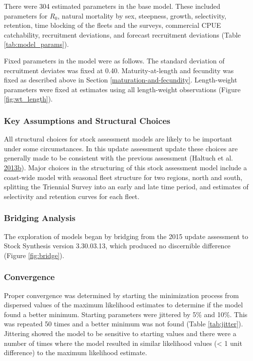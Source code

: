 \documentclass[12pt,]{article}
\begin{document}
There were 304 estimated parameters in the base model. These included
parameters for \(R_0\), natural mortality by sex, steepness, growth,
selectivity, retention, time blocking of the fleets and the surveys,
commercial CPUE catchability, recruitment deviations, and forecast
recruitment deviations (Table \ref{tab:model_params}).

Fixed parameters in the model were as follows. The standard deviation of
recruitment deviates was fixed at 0.40. Maturity-at-length and fecundity
was fixed as described above in Section \ref{maturation-and-fecundity}.
Length-weight parameters were fixed at estimates using all length-weight
observations (Figure \ref{fig:wt_length}).

\subsubsection{Key Assumptions and Structural
Choices}\label{key-assumptions-and-structural-choices}

All structural choices for stock assessment models are likely to be
important under some circumstances. In this update assessment update
these choices are generally made to be consistent with the previous
assessment (Haltuch et al.
\protect\hyperlink{ref-haltuch_status_2013}{2013}\protect\hyperlink{ref-haltuch_status_2013}{b}).
Major choices in the structuring of this stock assessment model include
a coast-wide model with seasonal fleet structure for two regions, north
and south, splitting the Triennial Survey into an early and late time
period, and estimates of selectivity and retention curves for each
fleet.

\subsubsection{Bridging Analysis}\label{bridging-analysis}

The exploration of models began by bridging from the 2015 update
assessment to Stock Synthesis version 3.30.03.13, which produced no
discernible difference (Figure \ref{fig:bridge}).

\subsubsection{Convergence}\label{convergence}

Proper convergence was determined by starting the minimization process
from dispersed values of the maximum likelihood estimates to determine
if the model found a better minimum. Starting parameters were jittered
by 5\% and 10\%. This was repeated 50 times and a better minimum was not
found (Table \ref{tab:jitter}). Jittering showed the model to be
sensitive to starting values and there were a number of times where the
model resulted in similar likelihood values (\textless{} 1 unit
difference) to the maximum likelihood estimate.
\end{document}
